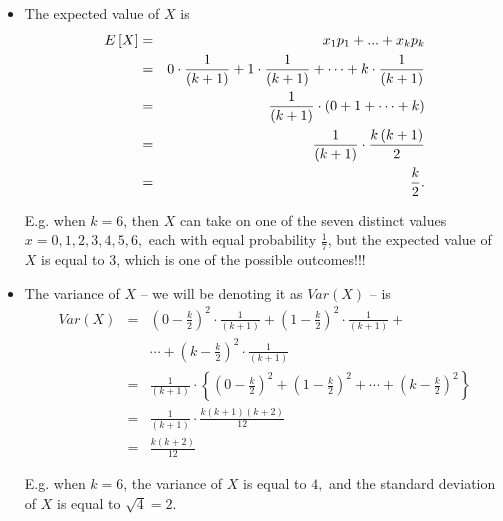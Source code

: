 \documentclass[smaller, handout]{beamer}\usepackage[]{graphicx}\usepackage[]{color}
\newenvironment{stepitemize}{\begin{itemize}[<+->]}{\end{itemize} }
\begin{document}
\begin{frame}{\secname}


\begin{stepitemize}
\item The expected value of $X$ is%
\begin{eqnarray*}
E\left[ X\right] &=&  x_1 p_1 + ... +  x_k p_k\\
&=& 0\cdot \frac{1}{\left( k+1\right) }+1\cdot \frac{1}{%
\left( k+1\right) }+\cdots +k\cdot \frac{1}{\left( k+1\right) } \\
&=&\frac{1}{\left( k+1\right) }\cdot\left( 0+1+\cdots +k\right) \\
&=&\frac{1}{\left( k+1\right) }\cdot \frac{k\left( k+1\right) }{2} \\
&=&\frac{k}{2}.
\end{eqnarray*}

E.g. when $k=6$, then $X$ can take on one of the seven distinct values
$x=0,1,2,3,4,5,6,$ each with equal probability $\frac{1}{7}$, but the
expected value of $X$ is equal to $3$, which is  one of the possible outcomes!!!

\end{stepitemize}

\end{frame}%

\begin{frame}{\secname}%


\begin{stepitemize}
\item The variance of $X$ -- we will be denoting it as $Var(X)$  -- is%
\begin{eqnarray*}
Var\left( X\right) &=&\left( 0-\frac{k}{2}\right) ^{2}\cdot \frac{1}{\left(
k+1\right) }+\left( 1-\frac{k}{2}\right) ^{2}\cdot \frac{1}{\left(
k+1\right) }+ \\
&&\cdots +\left( k-\frac{k}{2}\right) ^{2}\cdot \frac{1}{\left( k+1\right) }
\\
&=&\frac{1}{\left( k+1\right) }\cdot\left\{ \left( 0-\frac{k}{2}\right)
^{2}+\left( 1-\frac{k}{2}\right) ^{2}+\cdots +\left( k-\frac{k}{2}\right)
^{2}\right\} \\
&=&\frac{1}{\left( k+1\right) }\cdot \frac{k\left( k+1\right) \left(
k+2\right) }{12} \\
&=&\frac{k\left( k+2\right) }{12}
\end{eqnarray*}

E.g. when $k=6$, the variance of $X$ is equal to $4,$ and the standard
deviation of $X$ is equal to $\sqrt{4}=2.$
\end{stepitemize}

\end{frame}%
\end{document}
